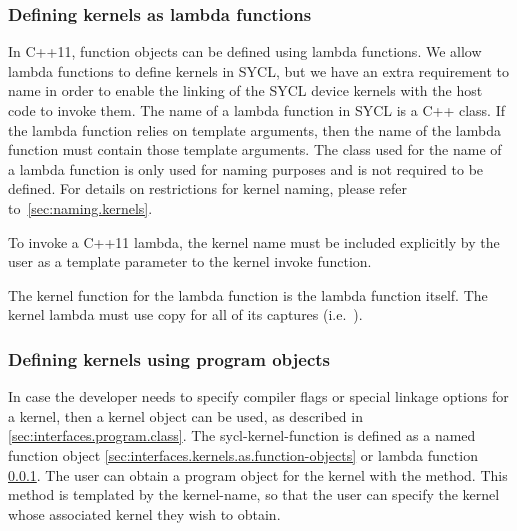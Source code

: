 
\subsubsection{Defining kernels as lambda functions}
\label{sec:interfaces.kernels.as.lambdas}

In C++11, function objects can be defined using lambda functions. We allow lambda
functions to define kernels in SYCL, but we have an extra requirement to
name  in order to enable the linking of the SYCL
device kernels with the host code to invoke them. The name of a lambda function
in SYCL is a C++ class. If the lambda function relies on template arguments,
then the name of the lambda function must contain those template arguments. The
class used for the name of a lambda function is only used for naming purposes
and is not required to be defined. For details on restrictions for kernel
naming, please refer to~\ref{sec:naming.kernels}.

To invoke a C++11 lambda, the kernel name must be included explicitly by the
user as a template parameter to the kernel invoke function.

The kernel function for the lambda function is the lambda function itself.
The kernel lambda must use copy for all of its captures (i.e.\ \tf{[=]}).


\subsubsection{Defining kernels using program objects}

In case the developer needs to specify compiler flags or special linkage options
for a kernel, then a kernel object can be used, as described in
\ref{sec:interfaces.program.class}. The \gls{sycl-kernel-function} is defined
as a named function object
\ref{sec:interfaces.kernels.as.function-objects} or lambda function
\ref{sec:interfaces.kernels.as.lambdas}. The user can obtain a program
object for the kernel with the  method. This
method is templated by the \gls{kernel-name}, so that the user
can specify the kernel whose associated kernel they wish to obtain.

